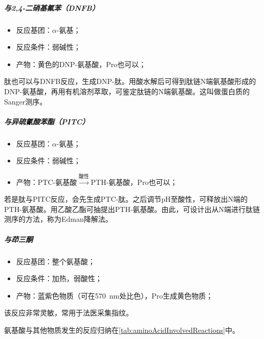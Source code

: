\subparagraph{与2,4-二硝基氟苯（DNFB）}

\begin{itemize}
	\item 反应基团：$\alpha$-氨基；
	\item 反应条件：弱碱性；
	\item 产物：黄色的DNP-氨基酸，Pro也可以；
\end{itemize}

肽也可以与DNFB反应，生成DNP-肽。用酸水解后可得到肽链N端氨基酸形成的DNP-氨基酸，再用有机溶剂萃取，可鉴定肽链的N端氨基酸。这叫做蛋白质的Sanger测序。

\subparagraph{与异硫氰酸苯酯（PITC）}

\begin{itemize}
	\item 反应基团：$\alpha$-氨基；
	\item 反应条件：弱碱性；
	\item 产物：PTC-氨基酸$\xrightarrow{\text{酸性}}$PTH-氨基酸，Pro也可以；
\end{itemize}

若是肽与PITC反应，会先生成PTC-肽。之后调节pH至酸性，可释放出N端的PTH-氨基酸。用乙酸乙酯可抽提出PTH-氨基酸。由此，可设计出从N端进行肽链测序的方法，称为Edman降解法。

\subparagraph{与茚三酮}

\begin{itemize}
	\item 反应基团：整个氨基酸；
	\item 反应条件：加热，弱酸性；
	\item 产物：蓝紫色物质（可在\SI{570}{\nm}处比色），Pro生成黄色物质；
\end{itemize}

该反应非常灵敏，常用于法医采集指纹。

氨基酸与其他物质发生的反应归纳在\autoref{tab:aminoAcidInvolvedReactions}中。

